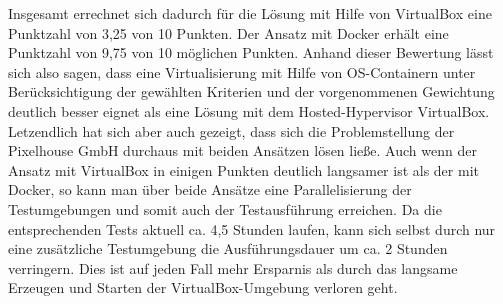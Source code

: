 Insgesamt errechnet sich dadurch für die Lösung mit Hilfe von VirtualBox eine Punktzahl von 3,25 von 10 Punkten. Der Ansatz mit Docker erhält eine Punktzahl von 9,75 von 10 möglichen Punkten. Anhand dieser Bewertung lässt sich also sagen, dass eine Virtualisierung mit Hilfe von OS-Containern unter Berücksichtigung der gewählten Kriterien und der vorgenommenen Gewichtung deutlich besser eignet als eine Lösung mit dem Hosted-Hypervisor VirtualBox. Letzendlich hat sich aber auch gezeigt, dass sich die Problemstellung der Pixelhouse GmbH durchaus mit beiden Ansätzen lösen ließe. Auch wenn der Ansatz mit VirtualBox in einigen Punkten deutlich langsamer ist als der mit Docker, so kann man über beide Ansätze eine Parallelisierung der Testumgebungen und somit auch der Testausführung erreichen. Da die entsprechenden Tests aktuell ca. 4,5 Stunden laufen, kann sich selbst durch nur eine zusätzliche Testumgebung die Ausführungsdauer um ca. 2 Stunden verringern. Dies ist auf jeden Fall mehr Ersparnis als durch das langsame Erzeugen und Starten der VirtualBox-Umgebung verloren geht.



